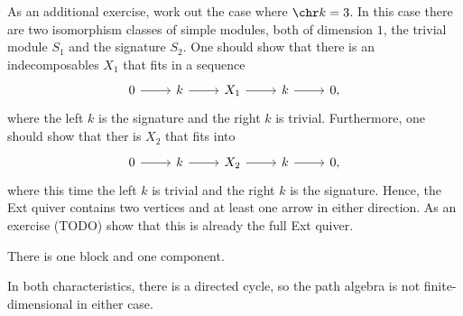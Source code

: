\begin{enumerate}
		As an additional exercise, work out the case where $\chr k = 3$. In this
		case there are two isomorphism classes of simple modules, both of dimension
		$1$, the trivial module $S_1$ and the signature $S_2$. One should show that there
		is an indecomposables $X_1$ that fits in a sequence
		\[\begin{tikzcd}
			0\ar[r] & k\ar[r] & X_1\ar[r] & k\ar[r] & 0,
		\end{tikzcd}\]
		where the left $k$ is the signature and the right $k$ is trivial. Furthermore,
		one should show that ther is $X_2$ that fits into
		\[\begin{tikzcd}
			0\ar[r] & k\ar[r] & X_2\ar[r] & k\ar[r] & 0,
		\end{tikzcd}\]
		where this time the left $k$ is trivial and the right $k$ is the signature.
		Hence, the Ext quiver contains two vertices and at least one arrow in either
		direction.
		As an exercise (TODO) show that this is already the full Ext quiver.

		There is one block and one component.

		In both characteristics, there is a directed cycle, so the path algebra
		is not finite-dimensional in either case.
\end{enumerate}

